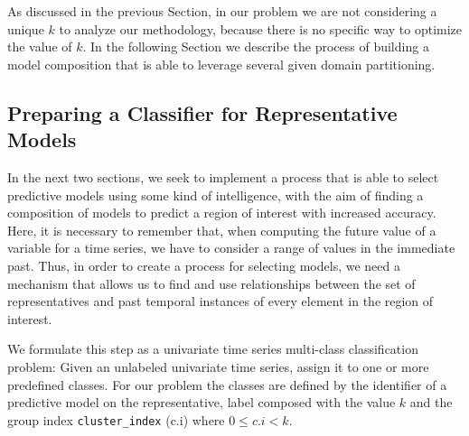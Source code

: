 As discussed in the previous Section, in our problem we are not considering a unique $k$ to analyze our methodology, because there is no specific way to optimize the value of $k$. In the following Section we describe the process of building a model composition that is able to leverage several given domain partitioning.

\subsection{Preparing a Classifier for Representative Models}
\label{Sec:Classifier}
In the next two sections, we seek to implement a process that is able to select predictive models using some kind of intelligence, with the aim of finding a composition of models to predict a region of interest with increased accuracy. Here, it is  necessary to remember that, when computing the future value of a variable for a time series, we have to consider a range of values in the immediate past. Thus, in order to create a process for selecting models, we need a mechanism that allows us to find and use relationships between the set of representatives and past temporal instances of every element in the region of interest. 

We formulate this step as a univariate time series multi-class classification problem: Given an unlabeled univariate time series, assign it to one or more predefined classes. For our problem the classes are defined by the identifier of a predictive model on the representative, label composed with the value $k$ and the group index \texttt{cluster\_index} (c.i) where $0 \leq c.i <k$. 



